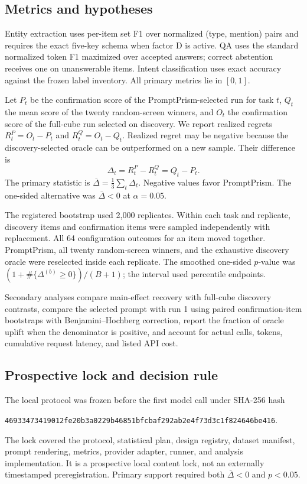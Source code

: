 \documentclass[11pt,a4paper]{article}
\newcommand{\method}{PromptPrism}
\begin{document}
\subsection{Metrics and hypotheses}

Entity extraction uses per-item set F1 over normalized (type, mention) pairs and requires the exact five-key schema when factor D is active. QA uses the standard normalized token F1 maximized over accepted answers; correct abstention receives one on unanswerable items. Intent classification uses exact accuracy against the frozen label inventory. All primary metrics lie in $[0,1]$.

Let $P_t$ be the confirmation score of the \method-selected run for task $t$, $Q_t$ the mean score of the twenty random-screen winners, and $O_t$ the confirmation score of the full-cube run selected on discovery. We report realized regrets $R^P_t=O_t-P_t$ and $R^Q_t=O_t-Q_t$. Realized regret may be negative because the discovery-selected oracle can be outperformed on a new sample. Their difference is
\begin{equation}
\Delta_t=R^P_t-R^Q_t=Q_t-P_t.
\end{equation}
The primary statistic is $\overline{\Delta}=\frac{1}{3}\sum_t\Delta_t$. Negative values favor \method. The one-sided alternative was $\overline{\Delta}<0$ at $\alpha=0.05$.

The registered bootstrap used 2,000 replicates. Within each task and replicate, discovery items and confirmation items were sampled independently with replacement. All 64 configuration outcomes for an item moved together. \method, all twenty random-screen winners, and the exhaustive discovery oracle were reselected inside each replicate. The smoothed one-sided $p$-value was $(1+\#\{\Delta^{(b)}\geq0\})/(B+1)$; the interval used percentile endpoints.

Secondary analyses compare main-effect recovery with full-cube discovery contrasts, compare the selected prompt with run 1 using paired confirmation-item bootstraps with Benjamini--Hochberg correction, report the fraction of oracle uplift when the denominator is positive, and account for actual calls, tokens, cumulative request latency, and listed API cost.

\subsection{Prospective lock and decision rule}

The local protocol was frozen before the first model call under SHA-256 hash
\begin{center}
\small\texttt{46933473419012fe20b3a0229b46851bfcbaf292ab2e4f73d3c1f824646be416}.
\end{center}
The lock covered the protocol, statistical plan, design registry, dataset manifest, prompt rendering, metrics, provider adapter, runner, and analysis implementation. It is a prospective local content lock, not an externally timestamped preregistration. Primary support required both $\overline{\Delta}<0$ and $p<0.05$.
\end{document}

